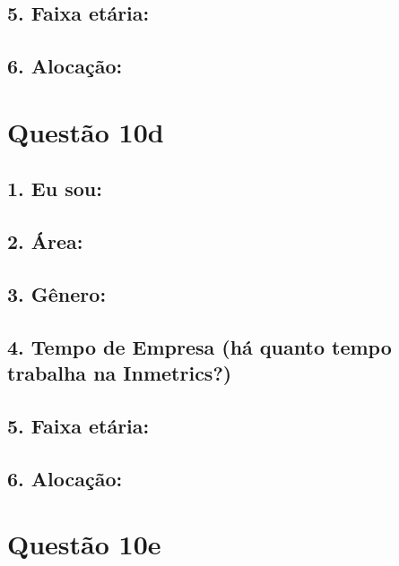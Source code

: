 \documentclass[]{book}
\begin{document}
\hypertarget{faixa-etaria-4}{%
\subsection{5. Faixa etária:}\label{faixa-etaria-4}}

\hypertarget{alocacao-4}{%
\subsection{6. Alocação:}\label{alocacao-4}}

\hypertarget{questao-10d}{%
\section{Questão 10d}\label{questao-10d}}

\hypertarget{eu-sou-5}{%
\subsection{1. Eu sou:}\label{eu-sou-5}}

\hypertarget{area-5}{%
\subsection{2. Área:}\label{area-5}}

\hypertarget{genero-5}{%
\subsection{3. Gênero:}\label{genero-5}}

\hypertarget{tempo-de-empresa-ha-quanto-tempo-trabalha-na-inmetrics-5}{%
\subsection{4. Tempo de Empresa (há quanto tempo trabalha na Inmetrics?)}\label{tempo-de-empresa-ha-quanto-tempo-trabalha-na-inmetrics-5}}

\hypertarget{faixa-etaria-5}{%
\subsection{5. Faixa etária:}\label{faixa-etaria-5}}

\hypertarget{alocacao-5}{%
\subsection{6. Alocação:}\label{alocacao-5}}

\hypertarget{questao-10e}{%
\section{Questão 10e}\label{questao-10e}}
\end{document}
